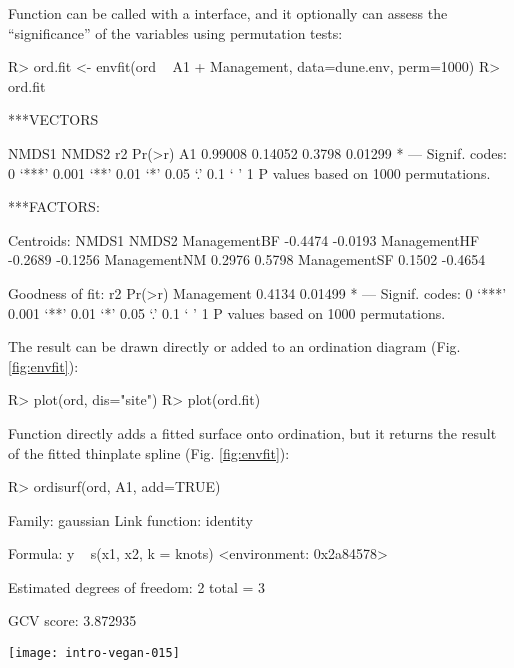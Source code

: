 \documentclass[article,nojss]{jss}
\begin{document}
Function  can be called with a 
interface, and it optionally can assess the ``significance'' of the
variables using permutation tests:
\begin{Schunk}
\begin{Sinput}
R> ord.fit <- envfit(ord ~ A1 + Management, data=dune.env, perm=1000)
R> ord.fit
\end{Sinput}
\begin{Soutput}
***VECTORS

     NMDS1   NMDS2     r2  Pr(>r)  
A1 0.99008 0.14052 0.3798 0.01299 *
---
Signif. codes:  0 ‘***’ 0.001 ‘**’ 0.01 ‘*’ 0.05 ‘.’ 0.1 ‘ ’ 1
P values based on 1000 permutations.

***FACTORS:

Centroids:
               NMDS1   NMDS2
ManagementBF -0.4474 -0.0193
ManagementHF -0.2689 -0.1256
ManagementNM  0.2976  0.5798
ManagementSF  0.1502 -0.4654

Goodness of fit:
               r2  Pr(>r)  
Management 0.4134 0.01499 *
---
Signif. codes:  0 ‘***’ 0.001 ‘**’ 0.01 ‘*’ 0.05 ‘.’ 0.1 ‘ ’ 1
P values based on 1000 permutations.
\end{Soutput}
\end{Schunk}
The result can be drawn directly or added to an ordination diagram
(Fig. \ref{fig:envfit}):
\begin{Schunk}
\begin{Sinput}
R> plot(ord, dis="site")
R> plot(ord.fit)
\end{Sinput}
\end{Schunk}

Function  directly adds a fitted surface onto
ordination, but it returns the result of the fitted thinplate spline
 (Fig. \ref{fig:envfit}):
\begin{Schunk}
\begin{Sinput}
R> ordisurf(ord, A1, add=TRUE)
\end{Sinput}
\begin{Soutput}
Family: gaussian 
Link function: identity 

Formula:
y ~ s(x1, x2, k = knots)
<environment: 0x2a84578>

Estimated degrees of freedom:
2  total = 3 

GCV score: 3.872935
\end{Soutput}
\end{Schunk}
\begin{SCfigure}
\texttt{[image: intro-vegan-015]}
\caption{Fitted vector and smooth surface for the thickness of A1
  horizon (, in cm), and centroids of Management levels.}
\label{fig:envfit}
\end{SCfigure}
\end{document}
